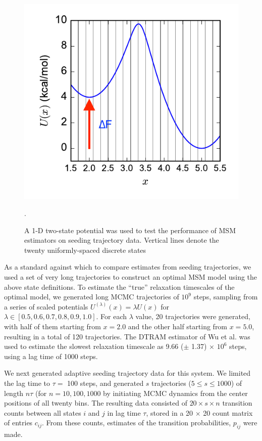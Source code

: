 \documentclass[%
 aip,
rsi,%
 amsmath,amssymb,
 reprint,%
]{revtex4-1}
\begin{document}
\begin{figure}[ht!]
    \includegraphics[width=0.9\columnwidth]{figures/1D-potential-v2.pdf}
    \caption{A 1-D two-state potential was used to test the performance of MSM estimators on seeding trajectory data.  Vertical lines denote the twenty uniformly-spaced discrete states}.
    \label{fig:1D-potential-v2}
\end{figure}

As a standard against which to compare estimates from seeding trajectories, we used a set of very long trajectories to construct an optimal MSM model using the above state definitions.   To estimate the  ``true'' relaxation timescales of the optimal model, we generated long MCMC trajectories of $10^9$ steps, sampling from a series of scaled potentials $U^{(\lambda)}(x) = \lambda U(x)$ for $\lambda \in [0.5, 0.6, 0.7, 0.8, 0.9, 1.0]$. For each $\lambda$ value, 20 trajectories were generated, with half of them starting from $x=2.0$ and the other half starting from $x=5.0$, resulting in a total of 120 trajectories.  The DTRAM estimator of Wu et al.\cite{Wu:2014jy} was used to estimate the slowest relaxation timescale as 9.66 ($\pm$ 1.37) $\times$ $10^6$ steps, using a lag time of 1000 steps.

We next generated adaptive seeding trajectory data for this system.  We limited the lag time to $\tau =$ 100 steps, and generated $s$ trajectories ($5\leq s \leq 1000$) of length $n\tau$ (for $n=10,100,1000$ by initiating MCMC dynamics from the center positions of all twenty bins.  The resulting data consisted of $20 \times s \times n$ transition counts between all states $i$ and $j$ in lag time $\tau$, stored in a 20 $\times$ 20 count matrix of entries $c_{ij}$.  From these counts, estimates of the transition probabilities, $p_{ij}$ were made. 
\end{document}
